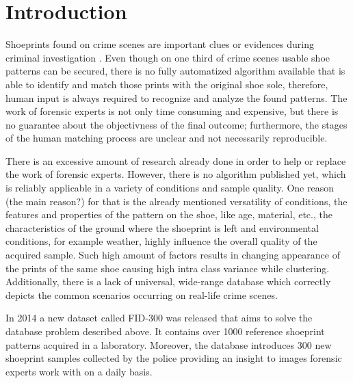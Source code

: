 \documentclass[draft,final]{vutinfth} %
\begin{document}

\tableofcontents %

\mainmatter

\chapter{Introduction}

\par
Shoeprints found on crime scenes are important clues or evidences during criminal investigation \cite{kong2014novel}.
Even though on one third \cite{alexandre1996computerized} of crime scenes usable shoe patterns can be secured, there is no fully automatized algorithm available that is able to identify and match those prints with the original shoe sole, therefore, human input is always required  \cite{wang2014automatic} to recognize and analyze the found patterns.
The work of forensic experts is not only time consuming and expensive, but there is no guarantee about the objectivness of the final outcome\cite{gueham2008automatic}; furthermore, the stages of the human matching process are unclear and not necessarily reproducible.
\par
There is an excessive amount of research already done \cite{rida2019forensic} in order to help or replace the work of forensic experts.
However, there is no algorithm published yet, which is reliably applicable in a variety of conditions and sample quality.
One reason (the main reason?) for that is the already mentioned versatility of conditions, the features and properties of the pattern on the shoe, like age, material, etc., the characteristics of the ground where the shoeprint is left and environmental conditions, for example weather, highly influence the overall quality of the acquired sample.
Such high amount of factors results in changing appearance of the prints of the same shoe causing high intra class variance while clustering.
Additionally, there is a lack of universal, wide-range database \cite{rida2019forensic} which correctly depicts the common scenarios occurring on real-life crime scenes.
\par
In 2014 a new dataset called FID-300 \cite{kortylewski2014unsupervised} was released that aims to solve the database problem described above.
It contains over 1000 reference shoeprint patterns acquired in a laboratory.
Moreover, the database introduces 300 new shoeprint samples collected by the police providing an insight to images forensic experts work with on a daily basis.
\end{document}
